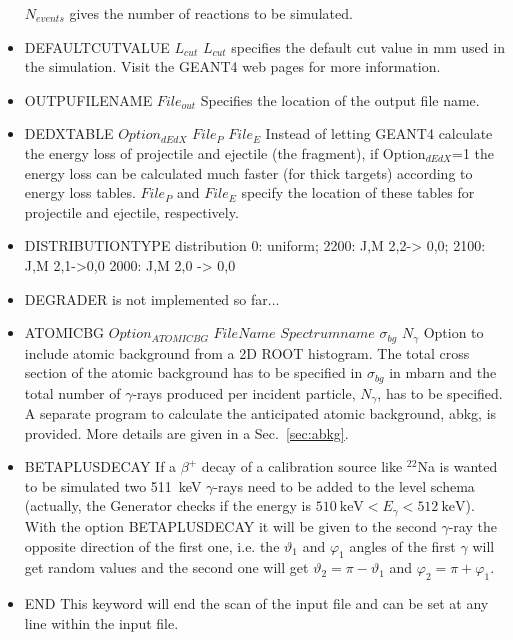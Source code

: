 \documentclass[12pt]{book}
\begin{document}
\begin{itemize}
  $N_{events}$ gives the number of reactions to be simulated.
\item DEFAULTCUTVALUE $L_{cut}$\hfill{} \linebreak
  $L_{cut}$ specifies the default cut value in mm used in the simulation. Visit the GEANT4 web pages for more information.
\item OUTPUFILENAME $File_{out}$\hfill{} \linebreak
  Specifies the location of the output file name.
\item DEDXTABLE $Option_{dEdX}$ $File_{P}$ $File_{E}$\hfill{} \linebreak
  Instead of letting GEANT4 calculate the energy loss of projectile and ejectile (the fragment), if Option$_{dEdX}$=1
  the energy loss can be calculated much faster (for thick targets) according to energy loss tables. 
  $File_{P}$ and $File_{E}$ specify the location of these tables for projectile and ejectile, respectively. 
\item DISTRIBUTIONTYPE distribution 0: uniform; 2200: J,M 2,2-> 0,0; 2100: J,M 2,1->0,0 2000: J,M 2,0 -> 0,0
\item DEGRADER is not implemented so far...
\item ATOMICBG $Option_{ATOMICBG}$ $FileName$ $Spectrumname$ $\sigma_{bg}$ $N_{\gamma}$\hfill{} \linebreak
  Option to include atomic background from a 2D ROOT histogram. The total cross section of the
  atomic background has to be specified in $\sigma_{bg}$ in mbarn and the total number of $\gamma$-rays produced
  per incident particle, $N_{\gamma}$, has to be specified. A separate program to calculate the
  anticipated atomic background, abkg, is provided. More details are given in a Sec.~\ref{sec:abkg}.
\item BETAPLUSDECAY \linebreak
  If a $\beta^+$ decay of a calibration source like $^{22}$Na is wanted to be simulated two 511~keV $\gamma$-rays need to be added to the level schema (actually, the Generator checks if the energy is $510~\textrm{keV}<E_{\gamma}<512~\textrm{keV}$). With the option BETAPLUSDECAY it will be given to the second $\gamma$-ray the opposite direction of the first one, i.e. the $\vartheta_1$ and $\varphi_1$ angles of the first $\gamma$ will get random values and the second one will get $\vartheta_2=\pi-\vartheta_1$ and $\varphi_2=\pi+\varphi_1$.
\item END\hfill{} \linebreak
  This keyword will end the scan of the input file and can be set at any line within the input file.
\end{itemize}
\end{document}
